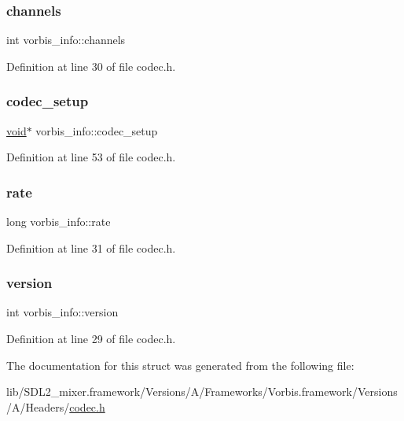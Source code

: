 \mbox{\label{structvorbis__info_a4240e042b91744b4fd810426f18252b4}} 
\subsubsection{\texorpdfstring{channels}{channels}}
{\footnotesize\ttfamily int vorbis\+\_\+info\+::channels}



Definition at line 30 of file codec.\+h.

\mbox{\label{structvorbis__info_a440988f081a417fd1586a4c3d44bc00c}} 
\subsubsection{\texorpdfstring{codec\_setup}{codec\_setup}}
{\footnotesize\ttfamily \mbox{\hyperlink{_s_d_l__opengles2__gl2ext_8h_ae5d8fa23ad07c48bb609509eae494c95}{void}}$\ast$ vorbis\+\_\+info\+::codec\+\_\+setup}



Definition at line 53 of file codec.\+h.

\mbox{\label{structvorbis__info_a01879ed23ecd9605cf6779ef2663a681}} 
\subsubsection{\texorpdfstring{rate}{rate}}
{\footnotesize\ttfamily long vorbis\+\_\+info\+::rate}



Definition at line 31 of file codec.\+h.

\mbox{\label{structvorbis__info_a2d832259b1e3fbf4d1cd619ab5743612}} 
\subsubsection{\texorpdfstring{version}{version}}
{\footnotesize\ttfamily int vorbis\+\_\+info\+::version}



Definition at line 29 of file codec.\+h.



The documentation for this struct was generated from the following file\+:\begin{DoxyCompactItemize}
\item 
lib/\+S\+D\+L2\+\_\+mixer.\+framework/\+Versions/\+A/\+Frameworks/\+Vorbis.\+framework/\+Versions/\+A/\+Headers/\mbox{\hyperlink{codec_8h}{codec.\+h}}\end{DoxyCompactItemize}
